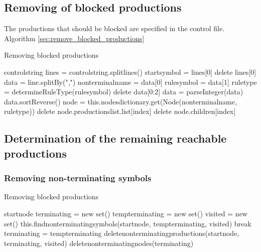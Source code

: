 \subsection{Removing of blocked productions}
The productions that should be blocked are specified in the control file.  
Algorithm \ref{sec:remove_blocked_productions}
\begin{algorithm}[H]
\caption{Removing blocked productions}
\begin{algorithmic}[1] 
\Require control\textunderscore string
\State lines = control\textunderscore string.splitlines()
\State start\textunderscore symbol = lines[0]
\State delete lines[0]
	\State data = line.splitBy(",")
	\State nonterminal\textunderscore name = data[0]
	\State rule\textunderscore symbol = data[1]
	\State rule\textunderscore type = determineRuleType(rule\textunderscore symbol)
	\State delete data[0:2]
	\State data = parseInteger(data)
	\State data.sortReverse()
		\State node = this.nodes\textunderscore dictionary.get(Node(nonterminal\textunderscore name, rule\textunderscore type))
		\State delete node.productions\textunderscore list.list[index]
		\State delete node.children[index]
	\EndFor
\EndFor
\end{algorithmic}
\label{alg:remove_blocked_productions}
\end{algorithm}

\subsection{Determination of the remaining reachable productions}
\subsubsection{Removing non-terminating symbols}
\begin{algorithm}[H]
\caption{Removing blocked productions}
\begin{algorithmic}[1] 
\Require start\textunderscore node
\State terminating = new set()
\State temp\textunderscore terminating = new set()
	\State visited = new set()
	\State this.find\textunderscore non\textunderscore terminating\textunderscore symbols(start\textunderscore node, temp\textunderscore terminating, visited)
		\State break
	\Else
		\State terminating = temp\textunderscore terminating
	\EndIf
\EndWhile
\State delete\textunderscore non\textunderscore terminating\textunderscore productions\textunderscore (start\textunderscore node, terminating, visited)
\State delete\textunderscore non\textunderscore terminating\textunderscore nodes(terminating)
\end{algorithmic}
\label{alg:remove_non_terminating_symbols}
\end{algorithm}


